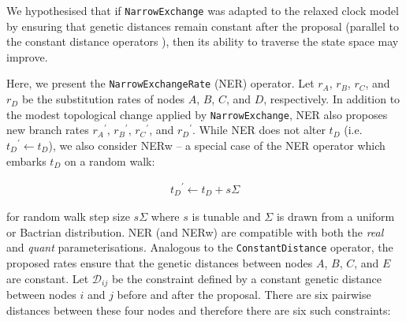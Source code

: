 \documentclass[10pt,letterpaper]{article}
\begin{document}
We hypothesised that if \texttt{NarrowExchange} was adapted to the relaxed clock model by ensuring that genetic distances remain constant after the proposal (parallel to the constant distance operators \cite{zhang2020improving}), then its ability to traverse the state space may improve. 




Here, we present the \texttt{NarrowExchangeRate} (NER) operator. 
Let $r_A$, $r_B$, $r_C$, and $r_D$ be the substitution rates of nodes $A$, $B$, $C$, and $D$, respectively. 
In addition to the modest topological change applied by \texttt{NarrowExchange}, NER also proposes new branch rates ${r_A}^\prime$, ${r_B}^\prime$, ${r_C}^\prime$, and ${r_D}^\prime$. While NER does not alter $t_D$ (i.e. ${t_D}^\prime \leftarrow t_D$), we also consider NERw -- a special case of the NER operator which embarks $t_D$ on a random walk:

\begin{align}
	{t_D}^\prime \leftarrow t_D + s\Sigma
\end{align}

\noindent
for random walk step size $s\Sigma$ where $s$ is tunable and $\Sigma$ is drawn from a uniform or Bactrian distribution. NER (and NERw) are compatible with both the \textit{real} and \textit{quant} parameterisations. 
Analogous to the \texttt{ConstantDistance} operator, the proposed rates ensure that the genetic distances between nodes $A$, $B$, $C$, and $E$ are constant. 
Let $\mathcal{D}_{ij}$ be the constraint defined by a constant genetic distance between nodes $i$ and $j$ before and after the proposal.
There are six pairwise distances between these four nodes and therefore there are six such constraints:
\end{document}

